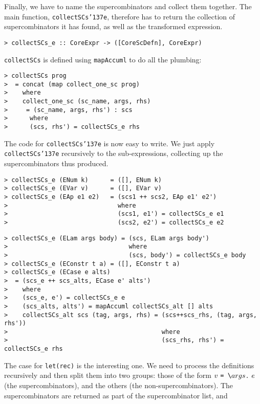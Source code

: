 Finally, we have to name the supercombinators and collect them
together.  The main function, \mbox{\tt collectSCs{\char'137}e}, therefore has to return
the collection of supercombinators it has found, as well as the
transformed expression.
\begin{verbatim}
> collectSCs_e :: CoreExpr -> ([CoreScDefn], CoreExpr)
\end{verbatim}
\mbox{\tt collectSCs} is defined using \mbox{\tt mapAccuml} to do all the plumbing:
\begin{verbatim}
> collectSCs prog
>  = concat (map collect_one_sc prog)
>    where
>    collect_one_sc (sc_name, args, rhs)
>     = (sc_name, args, rhs') : scs
>      where
>      (scs, rhs') = collectSCs_e rhs
\end{verbatim}
%
\par
The code for \mbox{\tt collectSCs{\char'137}e} is now easy to write.  We just apply
\mbox{\tt collectSCs{\char'137}e} recursively to the sub-expressions, collecting up the
supercombinators thus produced.
\begin{verbatim}
> collectSCs_e (ENum k)      = ([], ENum k)
> collectSCs_e (EVar v)      = ([], EVar v)
> collectSCs_e (EAp e1 e2)   = (scs1 ++ scs2, EAp e1' e2')
>                              where
>                              (scs1, e1') = collectSCs_e e1
>                              (scs2, e2') = collectSCs_e e2
\end{verbatim}
\begin{verbatim}
> collectSCs_e (ELam args body) = (scs, ELam args body')
>                                 where
>                                 (scs, body') = collectSCs_e body
> collectSCs_e (EConstr t a) = ([], EConstr t a)
> collectSCs_e (ECase e alts)
>  = (scs_e ++ scs_alts, ECase e' alts')
>    where
>    (scs_e, e') = collectSCs_e e
>    (scs_alts, alts') = mapAccuml collectSCs_alt [] alts
>    collectSCs_alt scs (tag, args, rhs) = (scs++scs_rhs, (tag, args, rhs'))
>                                          where
>                                          (scs_rhs, rhs') = collectSCs_e rhs
\end{verbatim}
\par
The case for \mbox{\tt let(rec)} is the interesting one.  We need to
process the definitions recursively and then split them into two
groups: those of the form $v ~\mbox{\tt =\ {\char'134}} args \mbox{\tt .}~e$ (the
supercombinators), and the others (the non-supercombinators).  The
supercombinators are returned as part of the supercombinator list, and
